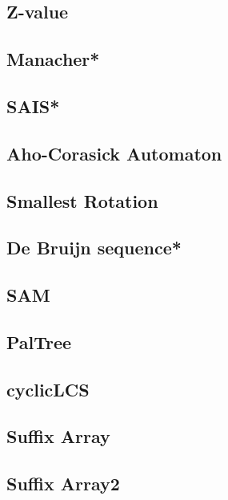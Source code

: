 \subsection{Z-value}

\subsection{Manacher*} %

\subsection{SAIS*}

\subsection{Aho-Corasick Automaton}

\subsection{Smallest Rotation}

\subsection{De Bruijn sequence*} %

\subsection{SAM}

\subsection{PalTree}

\subsection{cyclicLCS}

\subsection{Suffix Array}

\subsection{Suffix Array2}



